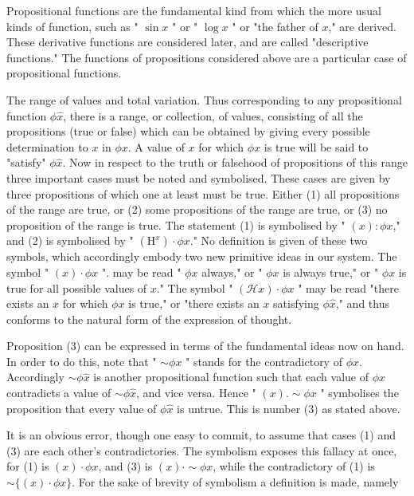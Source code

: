 \documentclass[10pt]{article}
\begin{document}
Propositional functions are the fundamental kind from which the more usual kinds of function, such as " $\sin x$ " or " $\log x$ " or "the father of $x$," are derived. These derivative functions are considered later, and are called "descriptive functions." The functions of propositions considered above are a particular case of propositional functions.

The range of values and total variation. Thus corresponding to any propositional function $\phi \hat{x}$, there is a range, or collection, of values, consisting of all the propositions (true or false) which can be obtained by giving every possible determination to $x$ in $\phi x$. A value of $x$ for which $\phi x$ is true will be said to "satisfy" $\phi \hat{x}$. Now in respect to the truth or falsehood of propositions of this range three important cases must be noted and symbolised. These cases are given by three propositions of which one at least must be true. Either (1) all propositions of the range are true, or (2) some propositions of the range are true, or (3) no proposition of the range is true. The statement (1) is symbolised by " $(x): \phi x$," and (2) is symbolised by " $\left(\mathrm{H}^{x}\right) \cdot \phi x$." No definition is given of these two symbols, which accordingly embody two new primitive ideas in our system. The symbol " $(x) \cdot \phi x$ ". may be read " $\phi x$ always," or " $\phi x$ is always true," or " $\phi x$ is true for all possible values of $x$." The symbol " $(\mathcal{H} x) \cdot \phi x$ " may be read "there exists an $x$ for which $\phi x$ is true," or "there exists an $x$ satisfying $\phi \hat{x}$," and thus conforms to the natural form of the expression of thought.

Proposition (3) can be expressed in terms of the fundamental ideas now on hand. In order to do this, note that " $\sim \phi x$ " stands for the contradictory of $\phi x$. Accordingly $\sim \phi \hat{x}$ is another propositional function such that each value of $\phi \hat{x}$ contradicts a value of $\sim \phi \hat{x}$, and vice versa. Hence " $(x) . \sim \phi x$ " symbolises the proposition that every value of $\phi \hat{x}$ is untrue. This is number (3) as stated above.

It is an obvious error, though one easy to commit, to assume that cases (1) and (3) are each other's contradictories. The symbolism exposes this fallacy at once, for (1) is $(x) \cdot \phi x$, and (3) is $(x) \cdot \sim \phi x$, while the contradictory of (1) is $\sim\{(x) \cdot \phi x\}$. For the sake of brevity of symbolism a definition is made, namely
\end{document}
